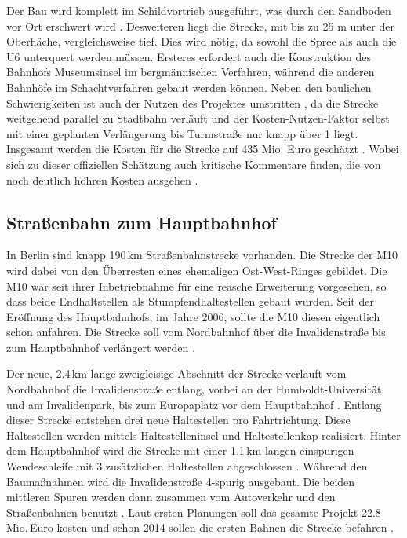 Der Bau wird komplett im Schildvortrieb ausgeführt, was durch den Sandboden vor
Ort erschwert wird \cite{bkhU5}. Desweiteren liegt die Strecke, mit bis zu 25 m unter der Oberfläche,
vergleichsweise tief. Dies wird nötig, da sowohl die Spree als auch die U6
unterquert werden müssen. Ersteres erfordert auch die Konstruktion des Bahnhofs
Museumsinsel im bergmännischen Verfahren, während die anderen Bahnhöfe im
Schachtverfahren gebaut werden können. Neben den baulichen Schwierigkeiten ist
auch der Nutzen des Projektes umstritten \cite{ftdU5}, da die Strecke weitgehend
parallel zu Stadtbahn verläuft und der Kosten-Nutzen-Faktor selbst mit einer geplanten Verlängerung bis Turmstraße
nur knapp über 1 liegt. Insgesamt werden die Kosten für die Strecke auf 435
Mio. Euro geschätzt \cite{bwwwU5}. Wobei sich zu dieser offiziellen Schätzung
auch kritische Kommentare finden, die von noch deutlich höhren Kosten ausgehen
\cite{ftdU5}.

\subsection*{Straßenbahn zum Hauptbahnhof}

In Berlin sind knapp 190\,km Straßenbahnstrecke vorhanden. Die Strecke
der M10 wird dabei von den Überresten eines ehemaligen Ost-West-Ringes
gebildet. Die M10 war seit ihrer Inbetriebnahme für eine reasche
Erweiterung vorgesehen, so dass beide Endhaltstellen als
Stumpfendhaltestellen gebaut wurden. Seit der Eröffnung des
Hauptbahnhofs, im Jahre 2006, sollte die M10 diesen eigentlich schon anfahren. Die Strecke soll vom Nordbahnhof über die
Invalidenstraße bis zum Hauptbahnhof verlängert
werden \cite{tsM10}.

Der neue, 2.4\,km lange zweigleisige Abschnitt der Strecke verläuft vom
Nordbahnhof die Invalidenstraße entlang, vorbei an der Humboldt-Universität
und am Invalidenpark, bis zum Europaplatz vor dem
Hauptbahnhof \cite{M10bInfo}. Entlang dieser Strecke entstehen
drei neue Haltestellen pro Fahrtrichtung. Diese Haltestellen werden
mittels Haltestelleninsel und Haltestellenkap realisiert. Hinter dem
Hauptbahnhof wird die Strecke mit einer 1.1\,km langen einspurigen
Wendeschleife mit 3 zusätzlichen Haltestellen abgeschlossen
\cite{zdfM10}. Während den Baumaßnahmen wird die Invalidenstraße
4-spurig ausgebaut. Die beiden mittleren Spuren werden dann zusammen
vom Autoverkehr und den Straßenbahnen benutzt
\cite{flyerInvalidestr}. Laut ersten Planungen soll das gesamte
Projekt 22.8\,Mio.\,Euro kosten und schon 2014 sollen die ersten
Bahnen die Strecke befahren \cite{mopoM10}.



